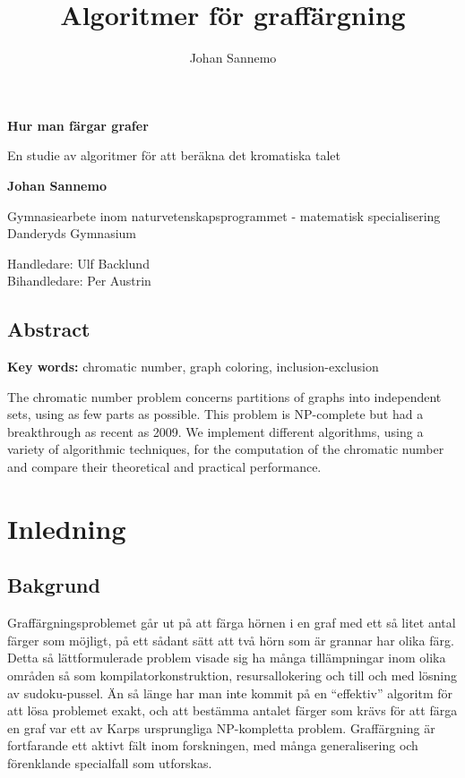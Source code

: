 \documentclass[a4paper]{report}
\title{Algoritmer för graffärgning}
\author{Johan Sannemo}
\date{}
\begin{document}
\begin{titlepage}
\begin{center}
\vspace*{1cm}
\Huge
\textbf{Hur man färgar grafer}
\vspace{0.5cm}
\large

En studie av algoritmer för att beräkna det kromatiska talet

\vspace{1.5cm}

\textbf{Johan Sannemo}


\end{center}
\vfill
\normalsize
Gymnasiearbete inom naturvetenskapsprogrammet - matematisk specialisering\\
Danderyds Gymnasium
\vspace{0.8cm}

\normalsize
Handledare: Ulf Backlund\\
Bihandledare: Per Austrin\\

\end{titlepage}

\clearpage
\section*{Abstract}
\textbf{Key words:} chromatic number, graph coloring, inclusion-exclusion

The chromatic number problem concerns partitions of graphs into independent sets, using as few parts as possible. This problem is
NP-complete but had a breakthrough as recent as 2009. We implement different algorithms, using a variety of algorithmic techniques,
for the computation of the chromatic number and compare their theoretical and practical performance.

\tableofcontents

\chapter{Inledning}
\section{Bakgrund}
Graffärgningsproblemet går ut på att färga hörnen i en graf med ett så litet antal färger som möjligt, på ett sådant sätt att två hörn som är grannar har olika färg. Detta så lättformulerade problem visade sig ha många tillämpningar inom olika områden så som kompilatorkonstruktion, resursallokering och till och med lösning av sudoku-pussel. Än så länge har man inte kommit på en ``effektiv'' algoritm för att lösa problemet exakt, och att bestämma antalet färger som krävs för att färga en graf var ett av Karps ursprungliga NP-kompletta problem. Graffärgning är fortfarande ett aktivt fält inom forskningen, med många generalisering och förenklande specialfall som utforskas.
\end{document}
